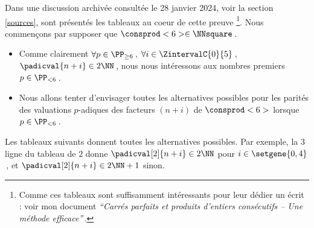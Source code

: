 Dans une discussion archivée consultée le 28 janvier 2024, voir la section \ref{sources}, sont présentés les tableaux au coeur de cette preuve
\footnote{
	Comme ces tableaux sont suffisamment intéressants pour leur dédier un écrit : voir mon document \emph{\enquote{Carrés parfaits et produits d'entiers consécutifs -- Une méthode efficace}}\,.
}.
Nous commençons par supposer que $\consprod<6> \in \NNsquare$\,.
%
\begin{itemize}
	\item  Comme clairement
    $\forall p \in \PP_{\geq 6}$\,, 
    $\forall i \in \ZintervalC{0}{5}$\,, 
    $\padicval{n + i} \in 2 \NN$\,,
    nous nous intéressons aux nombres premiers $p \in \PP_{< 6}$\,.

    \item Nous allons tenter d'envisager toutes les alternatives possibles pour les parités des valuations $p$-adiques des facteurs $(n + i)$ de $\consprod<6>$ lorsque $p \in \PP_{< 6}$\,.
\end{itemize}


Les tableaux suivants donnent toutes les alternatives possibles.
Par exemple, la 3\ieme{} ligne du tableau de $2$ donne $\padicval[2]{n + i} \in 2 \NN$ pour $i \in \setgene{0, 4}$\,,
et $\padicval[2]{n + i} \in 2 \NN + 1$ sinon.

